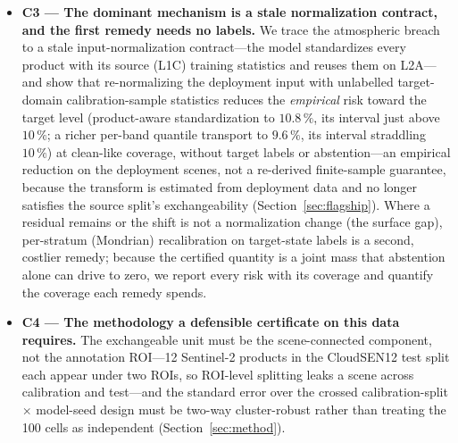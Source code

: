 \documentclass[preprint,3p,times]{elsarticle}
\begin{document}
\begin{itemize}
\item \textbf{C3 --- The dominant mechanism is a stale normalization contract, and the first remedy needs no labels.} We trace the atmospheric breach to a stale input-normalization contract---the model standardizes every product with its source (L1C) training statistics and reuses them on L2A---and show that re-normalizing the deployment input with unlabelled target-domain calibration-sample statistics reduces the \emph{empirical} risk toward the target level (product-aware standardization to $10.8\,\%$, its interval just above $10\,\%$; a richer per-band quantile transport to $9.6\,\%$, its interval straddling $10\,\%$) at clean-like coverage, without target labels or abstention---an empirical reduction on the deployment scenes, not a re-derived finite-sample guarantee, because the transform is estimated from deployment data and no longer satisfies the source split's exchangeability (Section~\ref{sec:flagship}). Where a residual remains or the shift is not a normalization change (the surface gap), per-stratum (Mondrian) recalibration on target-state labels is a second, costlier remedy; because the certified quantity is a joint mass that abstention alone can drive to zero, we report every risk with its coverage and quantify the coverage each remedy spends.
\item \textbf{C4 --- The methodology a defensible certificate on this data requires.} The exchangeable unit must be the scene-connected component, not the annotation ROI---12 Sentinel-2 products in the CloudSEN12 test split each appear under two ROIs, so ROI-level splitting leaks a scene across calibration and test---and the standard error over the crossed calibration-split $\times$ model-seed design must be two-way cluster-robust rather than treating the 100 cells as independent (Section~\ref{sec:method}).
\end{itemize}
\end{document}
